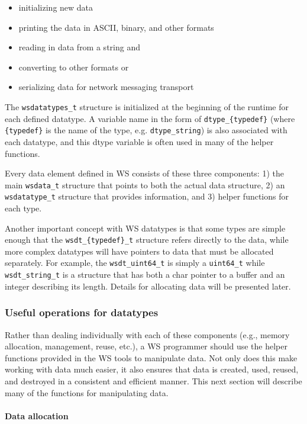 \documentclass[11pt]{article}
\begin{document}
\begin{itemize}
    \item initializing new data
    \item printing the data in ASCII, binary, and other formats
    \item reading in data from a string and 
    \item converting to other formats or
    \item serializing data for network messaging transport
\end{itemize}

The \texttt{wsdatatypes\_t} structure is initialized at the beginning of the 
runtime for each defined
datatype. A variable name in the form of \texttt{dtype\_\{typedef\}} (where
\texttt{\{typedef\}} is
the name of the type, e.g. \texttt{dtype\_string}) is also associated with each
datatype, and this dtype variable is often used in many of the helper 
functions.
 
Every data element defined in WS consists of these three components: 1) the 
main \texttt{wsdata\_t} structure that points to both the actual data 
structure, 2) an \texttt{wsdatatype\_t} structure that provides information, 
and 3) helper  functions for each type.
 
Another important concept with WS datatypes is that some types are simple 
enough that the \texttt{wsdt\_\{typedef\}\_t} structure refers directly to the 
data,
while more complex datatypes will have pointers to data that must be allocated 
separately. For example, the \texttt{wsdt\_uint64\_t} is simply a 
\texttt{uint64\_t} while \texttt{wsdt\_string\_t} is a structure that has both 
a char pointer to  a buffer and an integer describing its length. Details 
for allocating data will be presented later.

\subsubsection{Useful operations for datatypes}

Rather than dealing individually with each of these components (e.g., memory 
allocation, management, reuse, etc.), a WS programmer should use the helper 
functions provided in the WS tools to manipulate data.  Not only does this make
working with data much easier, it also ensures that data is created, used, 
reused, and destroyed in a consistent and efficient manner.  This next
section will describe many of the functions for manipulating data.

\paragraph{Data allocation\newline\newline}
\end{document}
